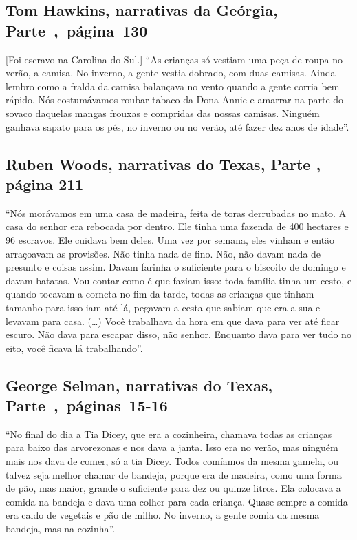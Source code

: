 \subsection{Tom Hawkins, narrativas da Geórgia, Parte~,~página~130}
\label{ref124}

{[}Foi escravo na Carolina do Sul.{]}
``As crianças só vestiam uma peça de roupa no verão, a camisa. No
inverno, a gente vestia dobrado, com duas camisas. Ainda lembro como a
fralda da camisa balançava no vento quando a gente corria bem rápido.
Nós costumávamos roubar tabaco da Dona Annie e amarrar na parte do
sovaco daquelas mangas frouxas e compridas das nossas camisas. Ninguém
ganhava sapato para os pés, no inverno ou no verão, até fazer dez anos
de idade''.

\subsection{Ruben Woods, narrativas do Texas, Parte , página 211}
\label{ref313}

``Nós morávamos em uma casa de madeira, feita de toras derrubadas no
mato. A casa do senhor era rebocada por dentro. Ele tinha uma fazenda de
400 hectares e 96 escravos. Ele cuidava bem deles. Uma vez por semana,
eles vinham e então arraçoavam as provisões. Não tinha nada de fino.
Não, não davam nada de presunto e coisas assim. Davam farinha o
suficiente para o biscoito de domingo e davam batatas. Vou contar como é
que faziam isso: toda família tinha um cesto, e quando tocavam a corneta
no fim da tarde, todas as crianças que tinham tamanho para isso iam até
lá, pegavam a cesta que sabiam que era a sua e levavam para casa.
(\ldots{}) Você trabalhava da hora em que dava para ver até ficar
escuro. Não dava para escapar disso, não senhor. Enquanto dava para ver
tudo no eito, você ficava lá trabalhando''.

\subsection{George Selman, narrativas do Texas, Parte~,~páginas~15-16}
\label{ref235}

``No final do dia a Tia Dicey, que era a cozinheira, chamava todas as
crianças para baixo das arvorezonas e nos dava a janta. Isso era no
verão, mas ninguém mais nos dava de comer, só a tia Dicey. Todos
comíamos da mesma gamela, ou talvez seja melhor chamar de bandeja,
porque era de madeira, como uma forma de pão, mas maior, grande o
suficiente para dez ou quinze litros. Ela colocava a comida na bandeja e
dava uma colher para cada criança. Quase sempre a comida era caldo de
vegetais e pão de milho. No inverno, a gente comia da mesma bandeja, mas
na cozinha''.

